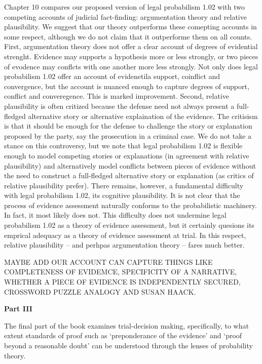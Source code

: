 \documentclass[10pt,dvipsnames,enabledeprecatedfontcommands]{scrartcl}
\begin{document}
Chapter 10 compares our proposed version of legal probabilism 1.02 with
two competing accounts of judicial fact-finding: argumentation theory
and relative plausibility. We suggest that our theory outperforms these
comepting accounts in some respect, although we do not claim that it
outperforme them on all counts. First, argumentation theory does not
offer a clear account of degrees of evidential strenght. Evidence may
supports a hypothesis more or less strongly, or two pieces of evodence
may conflcts with one another more less strongly. Not only does legal
probabilism 1.02 offer an account of evidenetila support, coinflict and
convergence, but the account is nuanced enough to capture degrees of
support, conflict and converegence. This is marked improvement. Second,
relative plausibility is often critized because the defense need not
always present a full-fledged alternative story or alternative
explaination of the evidence. The critisism is that it should be enough
for the defense to challenge the story or explanation proposed by the
party, say the prosecution in a criminal case. We do not take a stance
on this controversy, but we note that legal probabilism 1.02 is flexible
enough to model competing stories or explanations (in agreement with
relative plausibility) and alternatively model conflicts between pieces
of evidence without the need to construct a full-fledged alternative
story or explanation (as critics of relative plausibility prefer). There
remains, however, a fundamental difficulty with legal probabilism 1.02,
its cognitive plausibility. It is not clear that the process of evidence
assessment naturally conforms to the probabilistic machinery. In fact,
it most likely does not. This difficulty does not undermine legal
probabilism 1.02 as a theory of evidence assessment, but it certainly
quesions its emprical adequacy as a theory of evidence assessment at
trial. In this respect, relative plausibility -- and perhpas
argumentation theory -- fares much better.

MAYBE ADD OUR ACCOUNT CAN CAPTURE THINGS LIKE COMPLETENESS OF EVIDEMCE,
SPECIFICITY OF A NARRATIVE, WHETHER A PIECE OF EVIDENCE IS INDEPENDENTLY
SECURED, CROSSWORD PUZZLE ANALOGY AND SUSAN HAACK.

\vspace{3mm}

\noindent \textbf{Part III}

The final part of the book examines trial-decision making, specifically,
to what extent standards of proof such as `preponderance of the
evidence' and `proof beyond a reasonable doubt' can be understood
through the lenses of probability theory.
\end{document}
